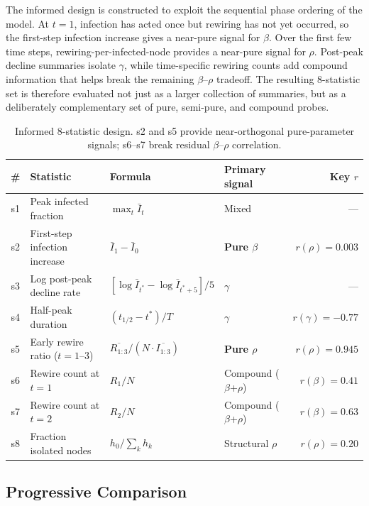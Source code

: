 \documentclass[12pt]{article}
\begin{document}
The informed design is constructed to exploit the sequential phase ordering \cite{GDB06} of the model. At $t=1$, infection has acted once but rewiring has not yet occurred, so the first-step infection increase gives a near-pure signal for $\beta$. Over the first few time steps, rewiring-per-infected-node provides a near-pure signal for $\rho$. Post-peak decline summaries isolate $\gamma$, while time-specific rewiring counts add compound information that helps break the remaining $\beta$--$\rho$ tradeoff. The resulting 8-statistic set is therefore evaluated not just as a larger collection of summaries, but as a deliberately complementary set of pure, semi-pure, and compound probes.

\begin{table}[h]
\centering
\small
\begin{tabular}{c p{3.4cm} p{4.0cm} p{2.8cm} r}
\toprule
\# & \textbf{Statistic} & \textbf{Formula} & \textbf{Primary signal} & \textbf{Key $r$} \\
\midrule
s1 & Peak infected fraction & $\max_t \bar{I}_t$ & Mixed & --- \\
s2 & First-step infection increase & $\bar{I}_1 - \bar{I}_0$ & \textbf{Pure $\beta$} & $r(\rho)=0.003$ \\
s3 & Log post-peak decline rate & $[\log \bar{I}_{t^*} - \log \bar{I}_{t^*+5}]/5$ & $\gamma$ & --- \\
s4 & Half-peak duration & $(t_{1/2} - t^*)/T$ & $\gamma$ & $r(\gamma)=-0.77$ \\
s5 & Early rewire ratio ($t=1$--$3$) & $\overline{R_{1:3}}/(N \cdot \overline{I_{1:3}})$ & \textbf{Pure $\rho$} & $r(\rho)=0.945$ \\
s6 & Rewire count at $t=1$ & $R_1/N$ & Compound ($\beta$+$\rho$) & $r(\beta)=0.41$ \\
s7 & Rewire count at $t=2$ & $R_2/N$ & Compound ($\beta$+$\rho$) & $r(\beta)=0.63$ \\
s8 & Fraction isolated nodes & $h_0/\sum_k h_k$ & Structural $\rho$ & $r(\rho)=0.20$ \\
\bottomrule
\end{tabular}
\caption{Informed 8-statistic design. s2 and s5 provide near-orthogonal pure-parameter signals; s6--s7 break residual $\beta$--$\rho$ correlation.}
\end{table}


\subsection{Progressive Comparison}
\end{document}
